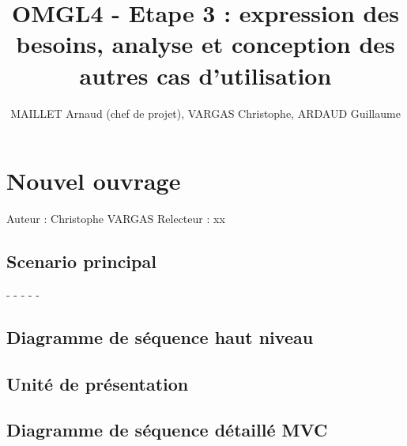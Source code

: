 \documentclass[a4paper,10pt]{report}
\title{OMGL4 - Etape 3 : expression des besoins, analyse et conception des autres cas d'utilisation}
\author{MAILLET Arnaud (chef de projet), VARGAS Christophe, ARDAUD Guillaume}
\begin{document}
\maketitle
\newpage
\null
\newpage
\tableofcontents
\newpage
\null
\newpage

\centering


\chapter*{Nouvel ouvrage}

Auteur : Christophe VARGAS
Relecteur : xx

\bigskip
\section*{Scenario principal}
\begin{flushleft}
-
-
-
-
-
\end{flushleft}

\bigskip

\section*{Diagramme de séquence haut niveau}

\newpage

\section*{Unité de présentation}

\section*{Diagramme de séquence détaillé MVC}

\newpage

\end{document}
